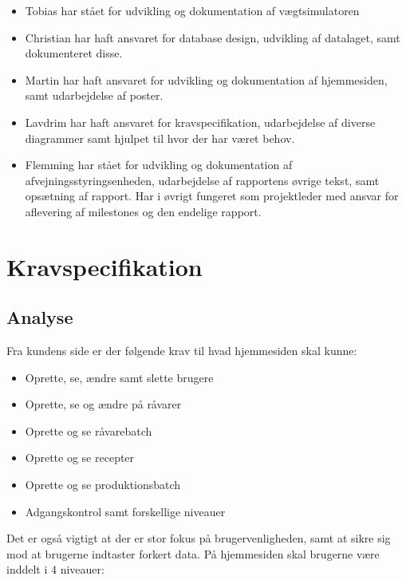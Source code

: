 \documentclass[a4paper]{article}
\begin{document}
\begin{itemize}
  \item Tobias har stået for udvikling og dokumentation af vægtsimulatoren
  \item Christian har haft ansvaret for database design, udvikling af datalaget, samt dokumenteret disse.
  \item Martin har haft ansvaret for udvikling og dokumentation af hjemmesiden, samt udarbejdelse af poster.
  \item Lavdrim har haft ansvaret for kravspecifikation, udarbejdelse af diverse diagrammer samt hjulpet til hvor der har været behov.
  \item Flemming har stået for udvikling og dokumentation af afvejningsstyringsenheden, udarbejdelse af rapportens øvrige tekst, samt opsætning af rapport. Har i øvrigt fungeret som projektleder med ansvar for aflevering af milestones og den endelige rapport.
 
\end{itemize}


\clearpage



\section{Kravspecifikation} %

\subsection{Analyse} %
Fra kundens side er der følgende krav til hvad hjemmesiden skal kunne:

\begin{itemize}
  \item Oprette, se, ændre samt slette brugere
  \item Oprette, se og ændre på råvarer
  \item Oprette og se råvarebatch 
  \item Oprette og se recepter
  \item Oprette og se produktionsbatch
  \item Adgangskontrol samt forskellige niveauer
\end{itemize}

Det er også vigtigt at der er stor fokus på brugervenligheden, samt at sikre sig mod at brugerne indtaster forkert data. På hjemmesiden skal brugerne være inddelt i 4 niveauer:
\end{document}
